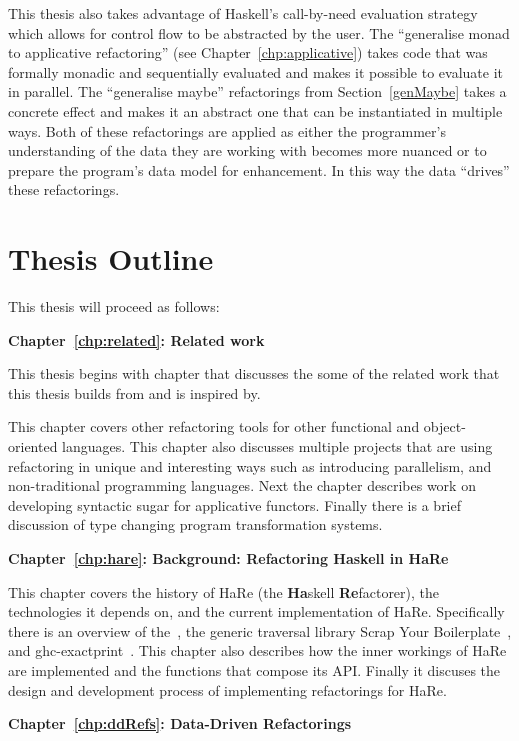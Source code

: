 This thesis also takes advantage of Haskell's call-by-need evaluation strategy which allows for control flow to be abstracted by the user. The ``generalise monad to applicative refactoring'' (see Chapter~\ref{chp:applicative}) takes code that was formally monadic and sequentially evaluated and makes it possible to evaluate it in parallel. The ``generalise maybe'' refactorings from Section~\ref{genMaybe} takes a concrete effect and makes it an abstract one that can be instantiated in multiple ways. Both of these refactorings are applied as either the programmer's understanding of the data they are working with becomes more nuanced or to prepare the program's data model for enhancement. In this way the data ``drives'' these refactorings.

\section{Thesis Outline}

This thesis will proceed as follows:


\textbf{Chapter~\ref{chp:related}: Related work}

This thesis begins with chapter that discusses the some of the related work that this thesis builds from and is inspired by. 

This chapter covers other refactoring tools for other functional and object-oriented languages. This chapter also discusses multiple projects that are using refactoring in unique and interesting ways such as introducing parallelism, and non-traditional programming languages. Next the chapter describes work on developing syntactic sugar for applicative functors. Finally there is a brief discussion of type changing program transformation systems.


\textbf{Chapter~\ref{chp:hare}: Background: Refactoring Haskell in HaRe}

This chapter covers the history of HaRe (the \textbf{Ha}skell \textbf{Re}factorer), the technologies it depends on, and the current implementation of HaRe. Specifically there is an overview of the~\citep{ghcApi}, the generic traversal library Scrap Your Boilerplate~\citep{syb}, and ghc-exactprint~\citep{exactprint}. This chapter also describes how the inner workings of HaRe are implemented and the functions that compose its API. Finally it discuses the design and development process of implementing refactorings for HaRe.

\textbf{Chapter~\ref{chp:ddRefs}: Data-Driven Refactorings}

